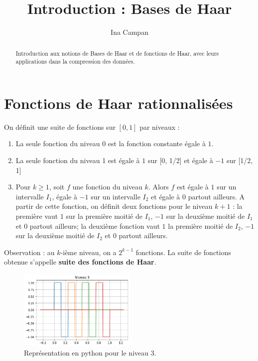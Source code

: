 \documentclass{article}
\title{Introduction : Bases de Haar}
\author{Ina Campan}
\begin{document}
\maketitle

\begin{abstract}

Introduction aux notions de Bases de Haar et de fonctions de Haar, avec leurs applications dans la compression des données.

\end{abstract}

\section{Fonctions de Haar rationnalisées}

On définit une suite de fonctions sur $[0,1]$ par niveaux :

\begin{enumerate}

\item La seule fonction du niveau 0 est la fonction constante égale à $1$.
\item La seule fonction du niveau 1 est égale à $1$ sur [0, 1/2] et égale à $-1$ sur [1/2, 1]
\item Pour $k \geqslant 1$, soit $f$ une fonction du niveau $k$. Alors $f$ est égale à $1$ sur un intervalle $I_1$, égale à $-1$ sur un intervalle $I_2$ et égale à $0$ partout ailleurs. A partir de cette fonction, on définit deux fonctions pour le niveau $k+1$ : la première vaut $1$ sur la première moitié de $I_1$, $-1$ sur la deuxième moitié de $I_1$ et $0$ partout ailleurs; la deuxième fonction vaut $1$ la première moitié de $I_2$, $-1$ sur la deuxième moitié de $I_2$ et $0$ partout ailleurs.

\end{enumerate}

Observation : au $k$-ième niveau, on a $2^{k-1}$ fonctions. La suite de fonctions obtenue s'appelle \textbf{suite des fonctions de Haar}.

\begin{figure}[h]
\centering
\caption{Représentation en python pour le niveau 3.}
\includegraphics[width=0.5\textwidth]{Images/HaarExempleNiveau3.png}
\end{figure}
\end{document}
